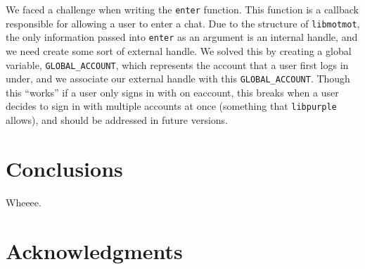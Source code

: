 \documentclass{sig-alternate}
\newcommand\libmotmot{\texttt{libmotmot}\xspace}
\newcommand\libpurple{\texttt{libpurple}\xspace}
\begin{document}
We faced a challenge when writing the \verb`enter` function.  This function is a
callback responsible for allowing a user to enter a chat.  Due to the structure
of \libmotmot, the only information passed into \verb`enter` as an argument is
an internal handle, and we need create some sort of external handle.  We solved
this by creating a global variable, \verb`GLOBAL_ACCOUNT`, which represents the
account that a user first logs in under, and we associate our external handle
with this \verb`GLOBAL_ACCOUNT`.  Though this ``works'' if a user only signs in
with on eaccount, this breaks when a user decides to sign in with multiple
accounts at once (something that \libpurple allows), and should be addressed in
future versions.

\section{Conclusions}

Wheeee.

\section{Acknowledgments}

\end{document}
